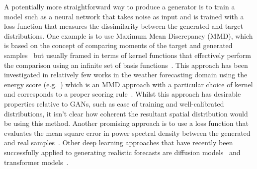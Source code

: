 \documentclass[../main.tex]{subfiles}
\begin{document}
A potentially more straightforward way to produce a generator is to train a model such as a neural network that takes noise as input and is trained with a loss function that measures the dissimilarity between the generated and target distributions. One example is to use Maximum Mean Discrepancy (MMD), which is based on the concept of comparing moments of the target and generated samples~\citep{li_generative_2015, dziugaite_training_2015} but usually framed in terms of kernel functions that effectively perform the comparison using an infinite set of basis functions~\citep{murphy_probabilistic_2022}. This approach has been investigated in relatively few works in the weather forecasting domain using the energy score (e.g.~\cite{pacchiardi_probabilistic_2021}) which is an MMD approach with a particular choice of kernel and corresponds to a proper scoring rule~\citep{gneiting_strictly_2007}. Whilst this approach has desirable properties relative to GANs, such as ease of training and well-calibrated distributions, it isn't clear how coherent the resultant spatial distribution would be using this method. Another promising approach is to use a loss function that evaluates the mean square error in power spectral density between the generated and real samples~\citep{singh_numerical_2019}. Other deep learning approaches that have recently been successfully applied to generating realistic forecasts are diffusion models~\citep{li_seeds_2023, addison_machine_2022, leinonen_latent_2023} and transformer models~\citep{ben-bouallegue_improving_2023}.








\end{document}
